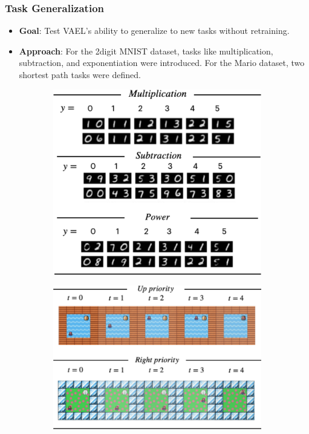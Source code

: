\documentclass[10pt,xcolor={dvipsnames}]{beamer}
\begin{document}
\begin{frame}[t]
    \frametitle{Task Generalization}
    \begin{itemize}
        \item \textbf{Goal}: Test VAEL’s ability to generalize to new tasks without retraining.
        \item \textbf{Approach}: For the 2digit MNIST dataset, tasks like multiplication, subtraction, and exponentiation were introduced. For the Mario dataset, two shortest path tasks were defined.
    \end{itemize}
    \begin{figure}[htb]
        \centering
        \begin{subfigure}[][0pt][t]{0.45\textwidth}
            \includegraphics[width=\textwidth]{figures/generaliz.png}
        \end{subfigure}
        \hfill
        \begin{subfigure}[][0pt][t]{0.5\textwidth}
            \includegraphics[width=\textwidth]{figures/generaliz2.png}

\end{subfigure}
\end{figure}
\end{frame}
\end{document}
